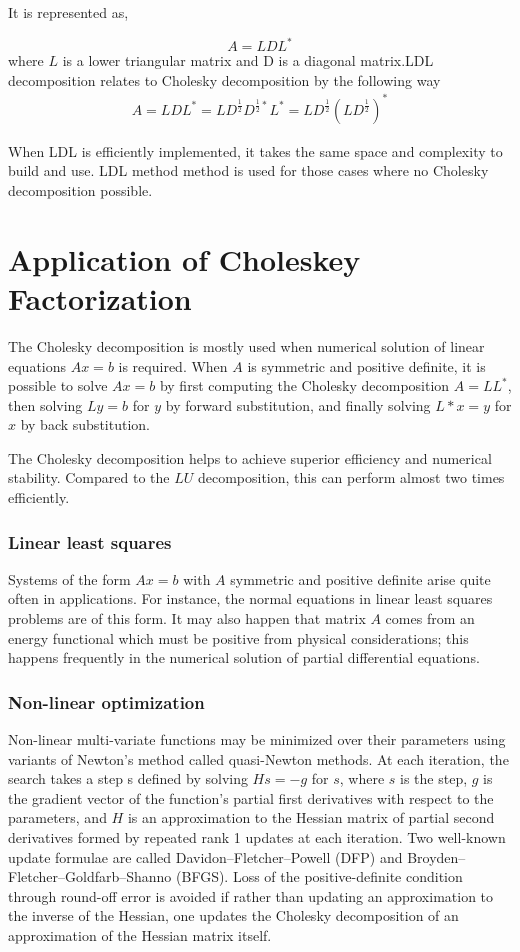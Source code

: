 It is represented as,

\begin{equation*}
	A = LDL^*
\end{equation*}
where $L$ is a lower triangular matrix and D is a diagonal matrix.LDL decomposition relates to Cholesky decomposition by the following way
\begin{equation*}
	\begin{aligned}
		A=LDL^*=LD^{\frac{1}{2}}D^{\frac{1}{2}*}L^*=LD^{\frac{1}{2}}(LD^{\frac{1}{2}})^*
	\end{aligned}
\end{equation*}

When LDL is efficiently implemented, it takes the same space and complexity to build and use. LDL method method is used for those cases where no Cholesky decomposition possible.

\section{Application of Choleskey Factorization}
The Cholesky decomposition is mostly used when numerical solution of linear equations $Ax = b$ is required. When $A$ is symmetric and positive definite, it is possible to solve $Ax = b$ by first computing the Cholesky decomposition $A = LL^*$, then solving $Ly = b$ for $y$ by forward substitution, and finally solving $L*x = y$ for $x$ by back substitution.

The Cholesky decomposition helps to achieve superior efficiency and numerical stability. Compared to the $LU$ decomposition, this can perform almost two times efficiently.
\subsubsection*{Linear least squares}
Systems of the form $Ax = b$ with $A$ symmetric and positive definite arise quite often in applications. For instance, the normal equations in linear least squares problems are of this form. It may also happen that matrix $A$ comes from an energy functional which must be positive from physical considerations; this happens frequently in the numerical solution of partial differential equations.
\subsubsection*{Non-linear optimization}
Non-linear multi-variate functions may be minimized over their parameters using variants of Newton's method called quasi-Newton methods. At each iteration, the search takes a step s defined by solving $Hs = -g$ for $s$, where $s$ is the step, $g$ is the gradient vector of the function's partial first derivatives with respect to the parameters, and $H$ is an approximation to the Hessian matrix of partial second derivatives formed by repeated rank 1 updates at each iteration. Two well-known update formulae are called Davidon–Fletcher–Powell (DFP) and Broyden–Fletcher–Goldfarb–Shanno (BFGS). Loss of the positive-definite condition through round-off error is avoided if rather than updating an approximation to the inverse of the Hessian, one updates the Cholesky decomposition of an approximation of the Hessian matrix itself.


